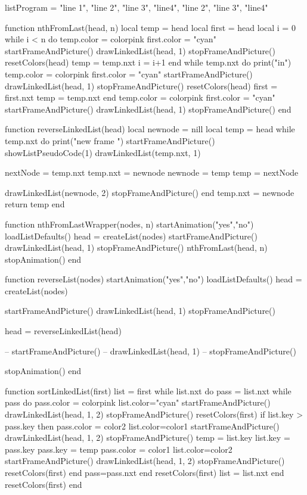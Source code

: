
\startluacode

listProgram = {
	"line 1",
	"line 2",
	"line 3",
	"line4",
	"line 2",
	"line 3",
	"line4"
}

function nthFromLast(head, n)
	local temp = head
	local first = head
	local i = 0
	while i < n do
		temp.color = colorpink
		first.color = "cyan"
		startFrameAndPicture()
		drawLinkedList(head, 1)
		stopFrameAndPicture()
		resetColors(head)
		temp = temp.nxt
		i = i+1
	end
	while temp.nxt do
		print("in")
		temp.color = colorpink
		first.color = "cyan"
		startFrameAndPicture()
		drawLinkedList(head, 1)
		stopFrameAndPicture()
		resetColors(head)
		first = first.nxt
		temp = temp.nxt
	end
	temp.color = colorpink
	first.color = "cyan"
	startFrameAndPicture()
	drawLinkedList(head, 1)
	stopFrameAndPicture()
end
	
function reverseLinkedList(head)
	local newnode = nill
	local temp = head
	while temp.nxt do
		print("new frame ") 
		startFrameAndPicture()
		showListPseudoCode(1)
		drawLinkedList(temp.nxt, 1)

		nextNode = temp.nxt
		temp.nxt = newnode
		newnode = temp
		temp = nextNode

		drawLinkedList(newnode, 2)
		stopFrameAndPicture()
	end
	temp.nxt = newnode
	return temp
end


function nthFromLastWrapper(nodes, n)
	startAnimation("yes","no")
	loadListDefaults()
	head = createList(nodes)
	startFrameAndPicture()
	drawLinkedList(head, 1)
	stopFrameAndPicture()
	nthFromLast(head, n)
	stopAnimation()
end

function reverseList(nodes)
	startAnimation("yes","no")
	loadListDefaults()
	head = createList(nodes)

	startFrameAndPicture()
	drawLinkedList(head, 1)
	stopFrameAndPicture()

	head = reverseLinkedList(head)

--	startFrameAndPicture()
--	drawLinkedList(head, 1)
--	stopFrameAndPicture()

	stopAnimation()
end

function sortLinkedList(first)
	list = first
	while list.nxt do
		pass = list.nxt
		while pass do  
			pass.color = colorpink
			list.color="cyan"
			startFrameAndPicture()
			drawLinkedList(head, 1, 2)
			stopFrameAndPicture()
			resetColors(first)
			if list.key > pass.key then
				pass.color = color2
				list.color=color1
				startFrameAndPicture()
				drawLinkedList(head, 1, 2)
				stopFrameAndPicture()
	   			temp = list.key
				list.key = pass.key
				pass.key = temp
				pass.color = color1
				list.color=color2
				startFrameAndPicture()
				drawLinkedList(head, 1, 2)
				stopFrameAndPicture()
				resetColors(first)
			end
			pass=pass.nxt
		end
		resetColors(first)
		list = list.nxt
	end
	resetColors(first)
end

